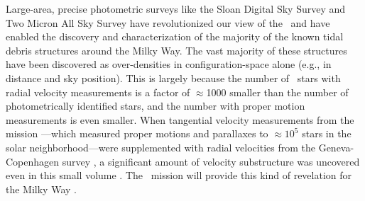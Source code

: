 Large-area, precise photometric surveys like the Sloan Digital Sky Survey
\citep[SDSS;][]{york00} and Two Micron All Sky Survey
\citep[2MASS;][]{skrutskie06} have revolutionized our view of the \mwhalo\ and
have enabled the discovery and characterization of the majority of the known
tidal debris structures around the Milky Way. The vast majority of these
structures have been discovered as over-densities in configuration-space alone
(e.g., in distance and sky position). This is largely because the number of
\mwhalo\ stars with radial velocity measurements is a factor of $\approx$1000
smaller than the number of photometrically identified stars, and the number with
proper motion measurements is even smaller. When tangential velocity
measurements from the  mission \citep{perryman97}---which
measured proper motions and parallaxes to $\approx$$10^5$ stars in the solar
neighborhood---were supplemented with radial velocities from the Geneva-
Copenhagen survey \citep{nordstrom04}, a significant amount of velocity
substructure was uncovered even in this small volume \citep[e.g.,][]{bovy09,
minchev10}. The \gaia\ mission will provide this kind of revelation for the
Milky Way \mwhalo.

\begin{figure}[h]
\centering
\caption{}
\label{fig:gaiastellarpops}
\end{figure}

